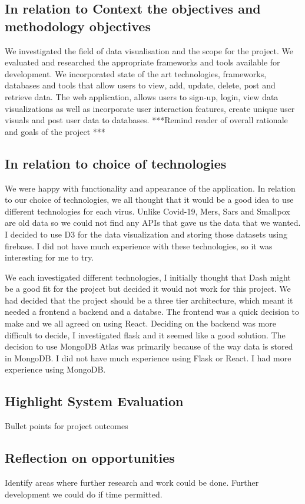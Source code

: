 \subsection{In relation to Context the objectives and methodology objectives}
We investigated the field of data visualisation and the scope for the project.
We evaluated and researched the appropriate frameworks and tools available for development.
We incorporated state of the art technologies, frameworks, databases and tools that allow users to view, add, update, delete, post and retrieve data.
The web application, allows users to sign-up, login, view data visualizations as well as incorporate user interaction features, create unique user visuals and post user data to databases.
***Remind reader of overall rationale and goals of the project ***
\subsection{In relation to choice of technologies}
We were happy with functionality and appearance of the application. 
In relation to our choice of technologies, we all thought that it would be a good idea to use different technologies for each virus. Unlike Covid-19, Mers, Sars and Smallpox are old data so we could not find any APIs that gave us the data that we wanted. I decided to use D3 for the data visualization and storing those datasets using firebase. I did not have much experience with these technologies, so it was interesting for me to try.

We each investigated different technologies, I initially thought that Dash might be a good fit for the project but decided it would not work for this project. We had decided that the project should be a three tier architecture, which meant it needed a frontend a backend and a databse. The frontend was a quick decision to make and we all agreed on using React. Deciding on the backend was more difficult to decide, I investigated flask and it seemed like a good solution. The decision to use MongoDB Atlas was primarily because of the way data is stored in MongoDB. I did not have much experience using Flask or React. I had more experience using MongoDB.

\subsection{Highlight System Evaluation}
Bullet points for project outcomes




\subsection{Reflection on opportunities}
Identify areas where further research and work could be done. Further development we could do if time permitted.



